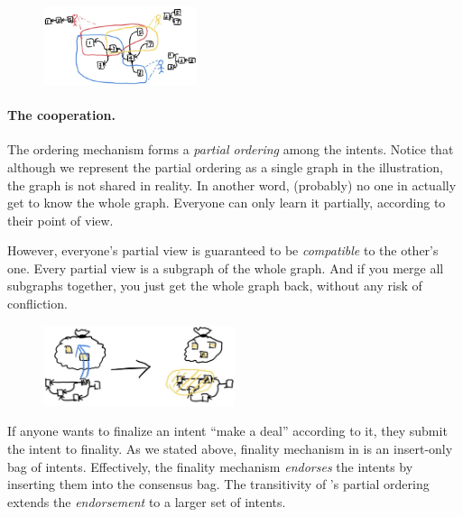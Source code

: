 \begin{figure}
    \includegraphics[width=0.4\textwidth]{graphs/IMG_0064}
\end{figure}

\paragraph{The cooperation.}
The ordering mechanism forms a \emph{partial ordering} among the intents.
Notice that although we represent the partial ordering as a single graph in the illustration, the graph is not shared in reality.
In another word, (probably) no one in \sys actually get to know the whole graph.
Everyone can only learn it partially, according to their point of view.

However, everyone's partial view is guaranteed to be \emph{compatible} to the other's one.
Every partial view is a subgraph of the whole graph.
And if you merge all subgraphs together, you just get the whole graph back, without any risk of confliction.

\begin{figure}[H]
    \includegraphics[width=0.5\textwidth]{graphs/IMG_0065}
    \Description{}
\end{figure}

If anyone wants to finalize an intent \ie ``make a deal'' according to it, they submit the intent to finality.
As we stated above, finality mechanism in \sys is an insert-only bag of intents.
Effectively, the finality mechanism \emph{endorses} the intents by inserting them into the consensus bag.
The transitivity of \sys's partial ordering extends the \emph{endorsement} to a larger set of intents.

